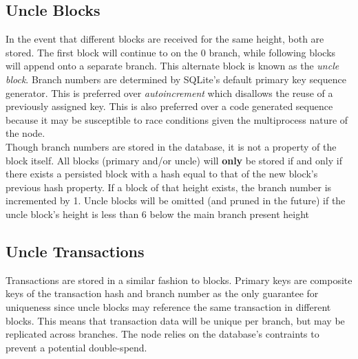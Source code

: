 \documentclass[10pt,twocolumn]{article}
\begin{document}
\subsection{Uncle Blocks}
In the event that different blocks are received for the same height, both are stored.  The first block will continue to on the 0 branch, while following blocks will append onto a separate branch.  This alternate block is known as the \textit{uncle block}.  Branch numbers are determined by SQLite's default primary key sequence generator.  This is preferred over \textit{autoincrement} which disallows the reuse of a previously assigned key.  This is also preferred over a code generated sequence because it may be susceptible to race conditions given the multiprocess nature of the node.\\
Though branch numbers are stored in the database, it is not a property of the block itself.  All blocks (primary and/or uncle) will \textbf{only} be stored if and only if there exists a persisted block with a hash equal to that of the new block's previous hash property.  If a block of that height exists, the branch number is incremented by 1.  Uncle blocks will be omitted (and pruned in the future) if the uncle block's height is less than 6 below the main branch present height
\subsection{Uncle Transactions}
Transactions are stored in a similar fashion to blocks.  Primary keys are composite keys of the transaction hash and branch number as the only guarantee for uniqueness since uncle blocks may reference the same transaction in different blocks.  This means that transaction data will be unique per branch, but may be replicated across branches.  The node relies on the database's contraints to prevent a potential double-spend.
\end{document}
